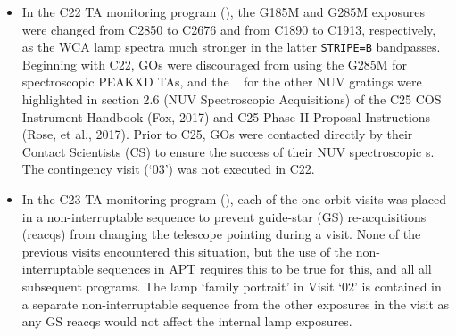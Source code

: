 \begin{itemize}
{The optional parameter \texttt{WAVECAL=YES} in the BOA$\times$MIRA target+Lamp image of the C20 program was discovered to not have taken the
expected internal lamp image expected in the \textsf{LC6601RYQ\_rawtag.fits} exposure. Correcting this inconsistency would have required significant APT, TRANS, and commanding changes.
As this internal calibration exposure combination is rarely executed, the C21 program included separate \texttt{TARGET=WAVE} companion lamp exposures for the target BOA exposure\footnote{The COS apertures are physically configured such that WCA light lands on the detector(s) when the PSA in place, but does not when the BOA is in place (INSERT REF). Therefore, whenever lamp images are required to verify BOA  exposures, the BOA is replaced by the PSA so that WCA light falls on the detector at the same location as it would fall for a PSA image.}
A second MIRA lamp image was added directly after the BOA$\times$MIRA , to verify the repeatability of the WCA lamp location when moving the BOA into and out of position.
To create time for the new exposures, the exposure times of the spectroscopic observations were scaled back, but still achieved the required S/N to measure the XD spectral locations.
}
\item{
In the C22 TA monitoring program (), the G185M and G285M exposures were changed from C2850 to C2676 and from C1890 to C1913, respectively, as the WCA lamp spectra much stronger in the latter \texttt{STRIPE=B} bandpasses. Beginning with C22, GOs were discouraged from using the G285M for spectroscopic PEAKXD TAs,
and the \cenwaves~ for the other NUV gratings were highlighted in section 2.6 (NUV Spectroscopic Acquisitions) of the C25 COS Instrument Handbook (Fox, 2017) and C25 Phase II Proposal Instructions (Rose, et al., 2017). Prior to C25, GOs were contacted directly by their Contact Scientists (CS) to ensure the success of their NUV spectroscopic s.
The contingency visit (`03') was not executed in C22.
}
\item{
In the C23 TA monitoring program (), each of the one-orbit visits was placed in a non-interruptable sequence to prevent guide-star (GS) re-acquisitions (reacqs) from changing the telescope pointing during a visit.
None of the previous visits encountered this situation, but the use of the non-interruptable sequences in APT requires this to be true for this, and all all subsequent programs.
The lamp `family portrait' in Visit `02' is contained in a separate non-interruptable sequence from the other exposures in the visit as any GS reacqs would not affect the internal lamp exposures.
}
\end{itemize}
